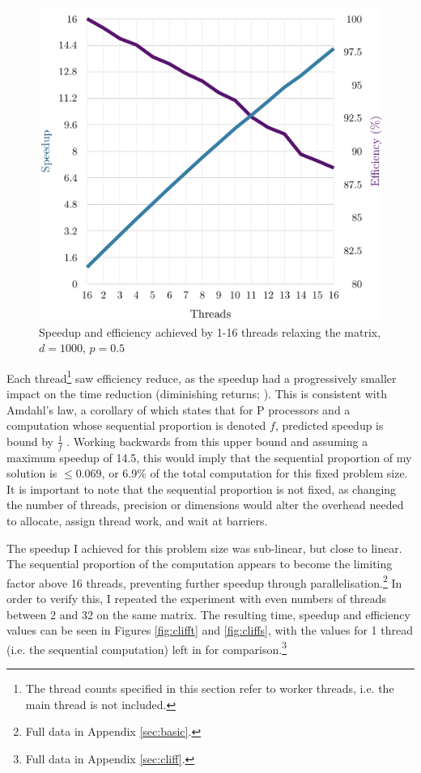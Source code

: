 \documentclass[12pt]{article}
\begin{document}
\begin{figure}[!htb]
\begin{minipage}{0.53\textwidth}
       \hspace{-0.8cm}\includegraphics[width=1.1\textwidth]{img/basic-threads-speedup.pdf}
        \centering\caption{Speedup and efficiency achieved by 1-16 threads relaxing the matrix, $d=1000$, $p=0.5$}
        \label{fig:basics}
    \end{minipage}
\end{figure}

Each thread\footnote{The thread counts specified in this section refer to worker threads, i.e. the main thread is not included.} saw efficiency reduce, as the speedup had a progressively smaller impact on the time reduction (diminishing returns; \citep{Amdahl}). This is consistent with Amdahl's law, a corollary of which states that for P processors and a computation whose sequential proportion is denoted $f$, predicted speedup is bound by $\frac{1}{f}$ \citep{springer}. Working backwards from this upper bound and assuming a maximum speedup of 14.5, this would imply that the sequential proportion of my solution is $\leq 0.069$, or 6.9\% of the total computation for this fixed problem size. It is important to note that the sequential proportion is not fixed, as changing the number of threads, precision or dimensions would alter the overhead needed to allocate, assign thread work, and wait at barriers.

The speedup I achieved for this problem size was sub-linear, but close to linear. The sequential proportion of the computation appears to become the limiting factor above 16 threads, preventing further speedup through parallelisation.\footnote{Full data in Appendix \ref{sec:basic}.} In order to verify this, I repeated the experiment with even numbers of threads between 2 and 32 on the same matrix. The resulting time, speedup and efficiency values can be seen in Figures \ref{fig:clifft} and \ref{fig:cliffs}, with the values for 1 thread (i.e. the sequential computation) left in for comparison.\footnote{Full data in Appendix \ref{sec:cliff}.}
\end{document}
